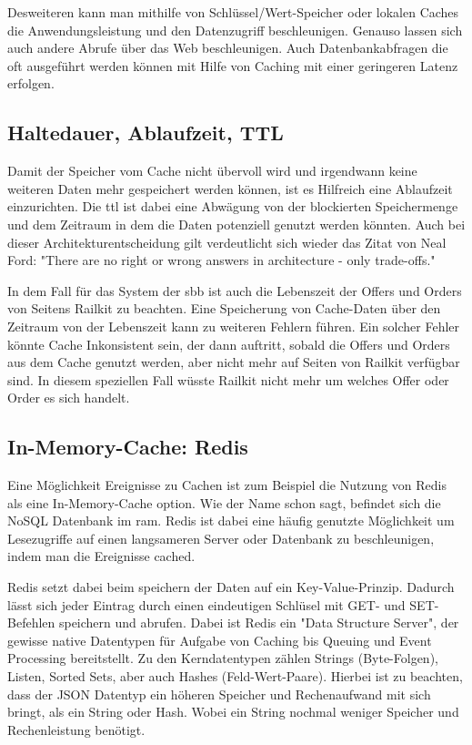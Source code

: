 Desweiteren kann man mithilfe von Schlüssel/Wert-Speicher oder lokalen Caches die Anwendungsleistung und den Datenzugriff beschleunigen. Genauso lassen sich auch andere Abrufe über das Web beschleunigen.
Auch Datenbankabfragen die oft ausgeführt werden können mit Hilfe von Caching mit einer geringeren Latenz erfolgen. %

\subsection{Haltedauer, Ablaufzeit, TTL}

Damit der Speicher vom Cache nicht übervoll wird und irgendwann keine weiteren Daten mehr gespeichert werden können, ist es Hilfreich eine Ablaufzeit einzurichten. Die \ac{ttl} ist dabei eine Abwägung von der blockierten Speichermenge und dem Zeitraum in dem die Daten potenziell genutzt werden könnten. Auch bei dieser Architekturentscheidung gilt verdeutlicht sich wieder das Zitat von Neal Ford: "There are no right or wrong answers in architecture - only trade-offs." %

In dem Fall für das System der \ac{sbb} ist auch die Lebenszeit der Offers und Orders von Seitens Railkit zu beachten. Eine Speicherung von Cache-Daten über den Zeitraum von der Lebenszeit kann zu weiteren Fehlern führen. Ein solcher Fehler könnte Cache Inkonsistent sein, der dann auftritt, sobald die Offers und Orders aus dem Cache genutzt werden, aber nicht mehr auf Seiten von Railkit verfügbar sind. %
In diesem speziellen Fall wüsste Railkit nicht mehr um welches Offer oder Order es sich handelt. %

\subsection{In-Memory-Cache: Redis}

Eine Möglichkeit Ereignisse zu Cachen ist zum Beispiel die Nutzung von Redis als eine In-Memory-Cache option. Wie der Name schon sagt, befindet sich die NoSQL Datenbank im \ac{ram}. %
Redis ist dabei eine häufig genutzte Möglichkeit um Lesezugriffe auf einen langsameren Server oder Datenbank zu beschleunigen, indem man die Ereignisse cached. %

Redis setzt dabei beim speichern der Daten auf ein Key-Value-Prinzip. Dadurch lässt sich jeder Eintrag durch einen eindeutigen Schlüsel mit GET- und SET-Befehlen speichern und abrufen. %
Dabei ist Redis ein "Data Structure Server", der gewisse native Datentypen für Aufgabe von Caching bis Queuing und Event Processing bereitstellt. Zu den Kerndatentypen zählen Strings (Byte-Folgen), Listen, Sorted Sets, aber auch Hashes (Feld-Wert-Paare). %
Hierbei ist zu beachten, dass der JSON Datentyp ein höheren Speicher und Rechenaufwand mit sich bringt, als ein String oder Hash. Wobei ein String nochmal weniger Speicher und Rechenleistung benötigt. %


